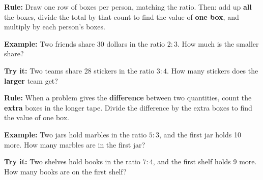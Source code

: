 \documentclass[12pt]{article}
\begin{document}


\begin{formulabox}
\textbf{Rule:} Draw one row of boxes per person, matching the ratio. Then:
add up \textbf{all} the boxes, divide the total by that count to find the value
of \textbf{one box}, and multiply by each person's boxes.
\end{formulabox}

\begin{examplebox}
\textbf{Example:} \quad Two friends share 30 dollars in the ratio $2{:}3$. How
much is the smaller share?
\end{examplebox}

\begin{tryitbox}
\textbf{Try it:} \quad Two teams share 28 stickers in the ratio $3{:}4$. How
many stickers does the \textbf{larger} team get?\\[2pt]
\end{tryitbox}


\begin{formulabox}
\textbf{Rule:} When a problem gives the \textbf{difference} between two
quantities, count the \textbf{extra} boxes in the longer tape. Divide the
difference by the extra boxes to find the value of one box.
\end{formulabox}

\begin{examplebox}
\textbf{Example:} \quad Two jars hold marbles in the ratio $5{:}3$, and the
first jar holds 10 more. How many marbles are in the first jar?
\end{examplebox}

\begin{tryitbox}
\textbf{Try it:} \quad Two shelves hold books in the ratio $7{:}4$, and the
first shelf holds 9 more. How many books are on the first shelf?\\[2pt]
\end{tryitbox}
\end{document}
